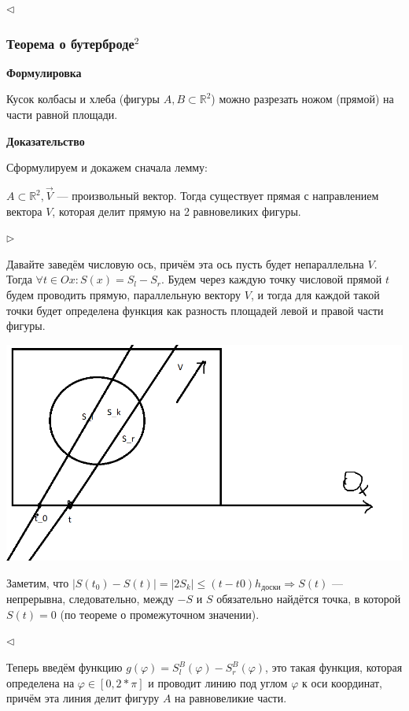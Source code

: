 \documentclass{article}
\begin{document}
$\lhd$

\subsubsection{Теорема о бутерброде\texorpdfstring{$^2$}{}}

\textbf{Формулировка}

Кусок колбасы и хлеба (фигуры $A, B \subset \mathbb{R}^2$) можно разрезать ножом (прямой) на части равной площади.

\textbf{Доказательство}

Сформулируем и докажем сначала лемму:

$A \subset \mathbb{R}^2, \Vec{V}$ --- произвольный вектор. Тогда существует прямая с направлением вектора $V$, которая делит прямую на 2 равновеликих фигуры.

$\rhd$

Давайте заведём числовую ось, причём эта ось пусть будет непараллельна $V$. Тогда $\forall t \in Ox : S(x) = S_l - S_r$. Будем через каждую точку числовой прямой $t$ будем проводить прямую, параллельную вектору $V$, и тогда для каждой такой точки будет определена функция как разность площадей левой и правой части фигуры.

\begin{center}
    \includegraphics[scale=0.44]{../images/sandwich.png}
\end{center}

Заметим, что $|S(t_0) - S(t)| = |2S_k| \le (t - t0)h_{\text{доски}} \Rightarrow S(t)$ --- непрерывна, следовательно, между $-S$ и $S$ обязательно найдётся точка, в которой $S(t) = 0$ (по теореме о промежуточном значении).

$\lhd$

Теперь введём функцию $g(\varphi) = S^B_l(\varphi) - S^B_r(\varphi)$, это такая функция, которая определена на $\varphi \in [0, 2 * \pi]$ и проводит линию под углом $\varphi$ к оси координат, причём эта линия делит фигуру $A$ на равновеликие части.
\end{document}
